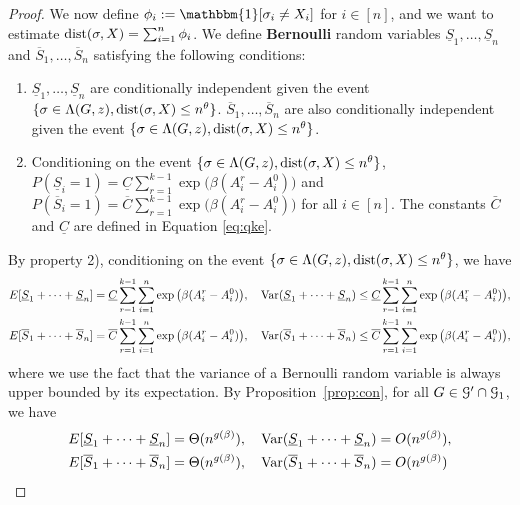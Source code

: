 \documentclass{article}
\begin{document}
\begin{proof}
	We now define 
	$\phi_i := \mathbbm{1}[\sigma_i \neq X_i]$ for $i\in[n]$, and
	we want to estimate $\operatorname{dist}(\sigma,X)=\sum_{i=1}^n \phi_i$.
	We define {\bf Bernoulli} random variables $\underline{S}_1,\dots, \underline{S}_n$ and $\overline{S}_1,\dots,\overline{S}_n$ satisfying the following conditions:
	\begin{enumerate}
		\item $\underline{S}_1,\dots, \underline{S}_n$ are conditionally independent given the event $\{\sigma\in \Lambda(G,z) ,\operatorname{dist}(\sigma, X) \le n^{\theta}\}$. $\overline{S}_1,\dots,\overline{S}_n$ are also conditionally independent given the event $\{\sigma\in \Lambda(G,z) ,\operatorname{dist}(\sigma, X) \le n^{\theta}\}$.
		\item Conditioning on the event $\{\sigma\in \Lambda(G,z) ,\operatorname{dist}(\sigma, X) \le n^{\theta}\}$, $P(\underline{S}_i=1)=\underline{C}
		\sum_{r=1}^{k-1}\exp\big(\beta (A^r_i-A^0_i) \big)$ and $P(\overline{S}_i=1)=\overline{C}
		\sum_{r=1}^{k-1}\exp\big(\beta (A^r_i-A^0_i) \big)$ for all $i\in[n]$. The constants $\bar{C}$ and $\underline{C}$ are defined in Equation \eqref{eq:qke}.
	\end{enumerate}
	By property 2), conditioning on the event $\{\sigma\in \Lambda(G,z) ,\operatorname{dist}(\sigma, X) \le n^{\theta}\}$, we have
	\begin{align*}
	& E[\underline{S}_1 + \dots + \underline{S}_n] = \underline{C}
	\sum_{r=1}^{k-1}\sum_{i=1}^n \exp\big(\beta (A^r_i-A^0_i) \big) , \quad
	\operatorname{Var}(\underline{S}_1 + \dots + \underline{S}_n) \le \underline{C}
	\sum_{r=1}^{k-1}\sum_{i=1}^n \exp\big(\beta (A^r_i-A^0_i) \big)
	, \\
	& E[\overline{S}_1 + \dots + \overline{S}_n] = \overline{C}
	\sum_{r=1}^{k-1}\sum_{i=1}^n \exp\big(\beta (A^r_i-A^0_i) \big) , \quad
	\operatorname{Var}(\overline{S}_1 + \dots + \overline{S}_n) \le \overline{C}
	\sum_{r=1}^{k-1}\sum_{i=1}^n \exp\big(\beta (A^r_i-A^0_i) \big) ,
	\end{align*}
	where we use the fact that the variance of a Bernoulli random variable is always upper bounded by its expectation.
	By Proposition~\ref{prop:con}, for all $G\in\mathcal{G}'\cap\mathcal{G}_1$, we have 
	\begin{align*}
	& E[\underline{S}_1 + \dots + \underline{S}_n] = \Theta(n^{g(\beta)}) , \quad
	\operatorname{Var}(\underline{S}_1 + \dots + \underline{S}_n) = O(n^{g(\beta)}) , \\
	& E[\overline{S}_1 + \dots + \overline{S}_n] = \Theta(n^{g(\beta)}) , \quad
	\operatorname{Var}(\overline{S}_1 + \dots + \overline{S}_n) = O(n^{g(\beta)}) 
	\end{align*}

\end{proof}
\end{document}

